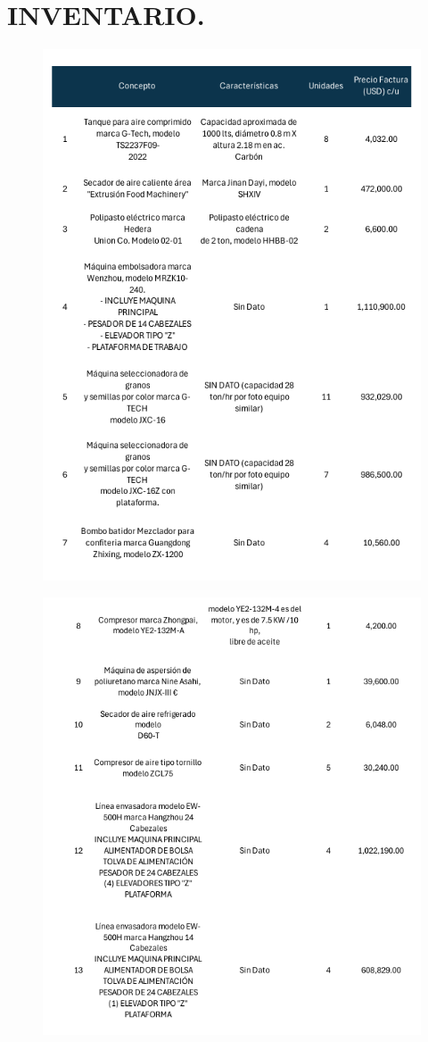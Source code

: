 \chapter{INVENTARIO.} %

\begin{figure}[hbtp!]
	\centering
	\includegraphics[width= 0.7 \linewidth, page = 1]{../0.imagenes/inv/Inv1}
\end{figure}
\newpage
\begin{figure}[hbtp!]
	\centering
	\includegraphics[width= 0.7 \linewidth, page = 1]{../0.imagenes/inv/Inv2}
\end{figure}

